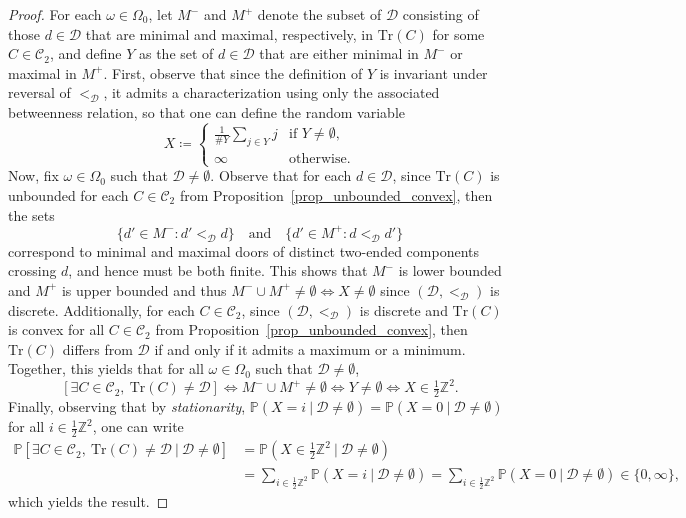 \documentclass[a4paper, 11pt]{article} %
\theoremstyle{plain}
\newcommand{\trace}{\mathrm{Tr}}
\newcommand{\D}{\mathcal D}
\newcommand{\Z}{\mathbb{Z}}
\newcommand{\1}{\mathds 1}
\renewcommand{\P}{\mathbb{P}}
\numberwithin{equation}{section}
\begin{document}
\begin{proof}
    For each $\omega\in\Omega_0$, let $M^-$ and $M^+$ denote the subset of $\D$ consisting of those
    $d\in\D$ that are minimal and maximal, respectively, in $\trace(C)$ for some $C\in\mathcal C_2$, and define $Y$ as the set of $d\in\D$ that are either minimal in $M^-$ or maximal in $M^+$. First, observe that since the definition of $Y$ is invariant under reversal of $<_\D$, it admits a characterization using only the associated betweenness relation, so that one can define the random variable
        \[X\coloneqq\begin{cases}
            \frac1{\#Y}\sum_{j\in Y}j&\text{if $Y\neq\emptyset$},\\
            \infty&\text{otherwise}.
        \end{cases}\]
    Now, fix $\omega\in\Omega_0$ such that $\D\neq\emptyset$. Observe that for each $d\in\D$, since $\trace(C)$ is unbounded for each $C\in\mathcal C_2$ from Proposition~\ref{prop_unbounded_convex}, then the sets
        \[\{d'\in M^-:d'<_\D d\}\quad\text{and}\quad\{d'\in M^+:d<_\D d'\}\]
    correspond to minimal and maximal doors of distinct two-ended components crossing $d$, and hence must be both finite. This shows that $M^-$ is lower bounded and $M^+$ is upper bounded and thus $M^-\cup M^+\neq\emptyset\iff X\neq\emptyset$ since $(\D,<_\D)$ is discrete. Additionally, for each $C\in\mathcal C_2$, since $(\D,<_\D)$ is discrete and $\trace(C)$ is convex for all $C\in\mathcal C_2$ from Proposition~\ref{prop_unbounded_convex}, then $\trace(C)$ differs from $\D$ if and only if it admits a maximum or a minimum. Together, this yields that for all $\omega\in\Omega_0$ such that $\D\neq\emptyset$,
        \[[\exists C\in\mathcal C_2,~\trace(C)\neq\D]\iff M^-\cup M^+\neq\emptyset\iff Y\neq\emptyset\iff X\in\tfrac12\Z^2.\]
    Finally, observing that by \emph{stationarity}, $\P(X=i~|~\D\neq\emptyset)=\P(X=0~|~\D\neq\emptyset)$ for all $i\in\frac12\Z^2$, one can write
        \begin{equation*}
            \begin{split}
                \P[\exists C\in\mathcal C_2,~\trace(C)\neq\D~|~\D\neq\emptyset]&=\P(X\in\tfrac12\Z^2~|~\D\neq\emptyset)\\
                &=\sum_{i\in\frac12\Z^2}\P(X=i~|~\D\neq\emptyset)
                =\sum_{i\in\frac12\Z^2}\P(X=0~|~\D\neq\emptyset)\in\{0,\infty\},
            \end{split}
        \end{equation*}
    which yields the result.
\end{proof}
\end{document}

